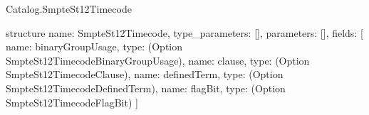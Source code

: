 \begin{lexlean}{Catalog.SmpteSt12Timecode}
\begin{semanticmodule}
structure{
  name: SmpteSt12Timecode,
  type_parameters: [],
  parameters: [],
  fields: [
    {name: binaryGroupUsage, type: (Option SmpteSt12TimecodeBinaryGroupUsage)},
    {name: clause, type: (Option SmpteSt12TimecodeClause)},
    {name: definedTerm, type: (Option SmpteSt12TimecodeDefinedTerm)},
    {name: flagBit, type: (Option SmpteSt12TimecodeFlagBit)}
  ]
}
\end{semanticmodule}
\end{lexlean}
